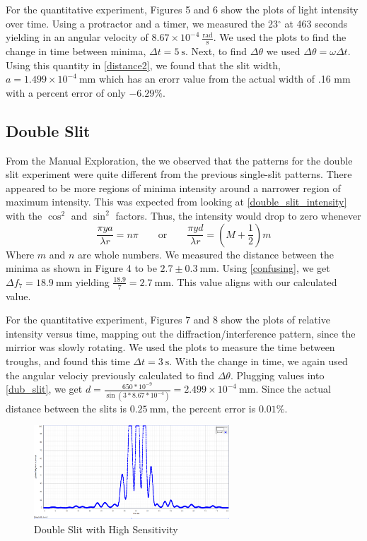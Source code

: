\documentclass{article}[12pt]
\begin{document}
For the quantitative experiment, Figures 5 and 6 show the plots of light intensity over time.
Using a protractor and a timer, we measured the 23$ {}^{\circ} $ at 463 seconds yielding in an angular velocity of $ 8.67 \times 10^{-4}~\mathrm{\frac{rad}{s}} $.
We used the plots to find the change in time between minima, $ \Delta t = 5~\mathrm{s} $.
Next, to find $ \Delta \theta  $ we used $ \Delta \theta = \omega \Delta t  $.
Using this quantity in \eqref{distance2}, we found that the slit width, $ a = 1.499\times 10 ^{-4}~\mathrm{mm} $ which has an erorr value from the actual width of .16 mm with a percent error of only $ -6.29\% $.

\subsection{Double Slit}

From the Manual Exploration, the we observed that the patterns for the double slit experiment were quite different from the previous single-slit patterns.
There appeared to be more regions of minima intensity around a narrower region of maximum intensity.
This was expected from looking at \eqref{double_slit_intensity} with the $ \cos ^2 $ and $ \sin ^2 $ factors.
Thus, the intensity would drop to zero whenever
\begin{equation*}
  \frac{\pi y a}{\lambda  r} = n\pi \qquad \text{or} \qquad \frac{\pi y d}{\lambda r} = (M+\frac{1}{2}) m
\end{equation*}
Where $ m $ and $ n $ are whole numbers.
We measured the distance between the minima as shown in Figure 4 to be $ 2.7 \pm 0.3~\mathrm{mm} $. 
Using \eqref{confusing}, we get $ \Delta f_7 = 18.9~\mathrm{mm} $ yielding $ \frac{18.9}{7} = 2.7~\mathrm{mm} $. 
This value aligns with our calculated value.

For the quantitative experiment, Figures 7 and 8 show the plots of relative intensity versus time, mapping out the diffraction/interference pattern, since the mirrior was slowly rotating.
We used the plots to measure the time between troughs, and found this time $ \Delta t = 3~\mathrm{s} $.
With the change in time, we again used the angular velociy previously calculated to find $ \Delta \theta  $.
Plugging values into \eqref{dub_slit}, we get $ d = \frac{650*10^{-9}}{\sin (3*8.67*10^{-4})} = 2.499 \times 10^{-4}~\mathrm{mm} $.
Since the actual distance between the slits is $ 0.25~\mathrm{mm} $, the percent error is $ 0.01\% $.
\begin{figure}
  \center
  \includegraphics[width=0.65\textwidth]{figures/double_high.PNG}
  \caption{Double Slit with High Sensitivity}
\end{figure}
\end{document}
